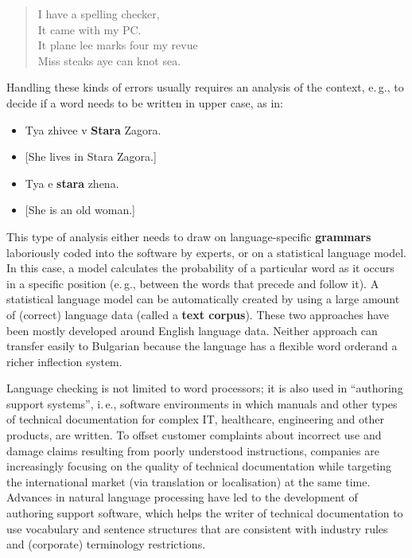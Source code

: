 \documentclass[]{../../metanetpaper}
\begin{document}
\begin{multicols}{2}
\begin{quote}
  I have a spelling checker,\\
  It came with my PC.\\
  It plane lee marks four my revue\\
  Miss steaks aye can knot sea.
\end{quote}

Handling these kinds of errors usually requires an analysis of the context, e.\,g., to decide if a word needs to be written in upper case, as in:

\begin{itemize}
\item Tya zhivee v \textbf{Stara} Zagora.
\item[] {[}She lives in Stara Zagora.{]} 
\item Tya e \textbf{stara} zhena.
\item[] {[}She is an old woman.{]}
\end{itemize}

This type of analysis either needs to draw on language-specific \textbf{grammars} laboriously coded into the software by experts, or on a statistical language model. In this case, a model calculates the probability of a particular word as it occurs in a specific position (e.\,g., between the words that precede and follow it). A statistical language model can be automatically created by using a large amount of (correct) language data (called a \textbf{text corpus}). These two approaches have been mostly developed around English language data. Neither approach can transfer easily to Bulgarian because the language has a flexible word orderand a richer inflection system. 

Language checking is not limited to word processors; it is also used in “authoring support systems”, i.\,e., software environments in which manuals and other types of technical documentation for complex IT, healthcare, engineering and other products, are written. To offset customer complaints about incorrect use and damage claims resulting from poorly understood instructions, companies are increasingly focusing on the quality of technical documentation while targeting the international market (via translation or localisation) at the same time. Advances in natural language processing have led to the development of authoring support software, which helps the writer of technical documentation to use vocabulary and sentence structures that are consistent with industry rules and (corporate) terminology restrictions.


\end{multicols}
\end{document}
